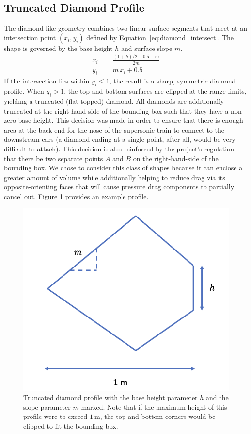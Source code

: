 \documentclass[11pt]{article}
\begin{document}
\subsection{Truncated Diamond Profile}
The diamond-like geometry combines two linear surface segments that meet at an intersection point $(x_i, y_i)$ defined by Equation~\ref{eq:diamond_intersect}. The shape is governed by the base height $h$ and surface slope $m$.
\begin{subequations} \label{eq:diamond_intersect}
\begin{align}
x_i &= \frac{(1+h)/2 - 0.5 + m}{2m} \label{eq:diamond_xi}\\
y_i &= m\,x_i + 0.5 \label{eq:diamond_yi}
\end{align}
\end{subequations}
If the intersection lies within $y_i \le 1$, the result is a sharp, symmetric diamond profile. When $y_i > 1$, the top and bottom surfaces are clipped at the range limits, yielding a truncated (flat-topped) diamond. All diamonds are additionally truncated at the right-hand-side of the bounding box such that they have a non-zero base height. This decision was made in order to ensure that there is enough area at the back end for the nose of the supersonic train to connect to the downstream cars (a diamond ending at a single point, after all, would be very difficult to attach). This decision is also reinforced by the project's regulation that there be two separate points $A$ and $B$ on the right-hand-side of the bounding box. We chose to consider this class of shapes because it can enclose a greater amount of volume while additionally helping to reduce drag via its opposite-orienting faces that will cause pressure drag components to partially cancel out. Figure \ref{fig:diamond} provides an example profile.
\begin{figure}[H]
\centering
    \includegraphics[width=0.5\linewidth]{diamond.png}
    \caption{Truncated diamond profile with the base height parameter $h$ and the slope parameter $m$ marked. Note that if the maximum height of this profile were to exceed $\SI{1}{\meter}$, the top and bottom corners would be clipped to fit the bounding box.}
\label{fig:diamond}
\end{figure}
\end{document}
